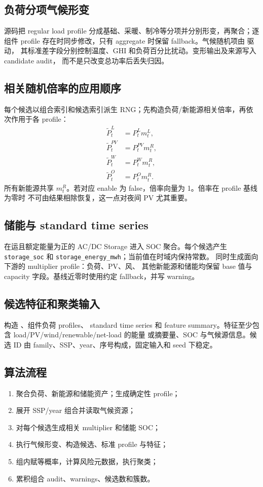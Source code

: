 \subsection{负荷分项气候形变}
源码把 regular load profile 分成基础、采暖、制冷等分项并分别形变，再聚合；逐组件 profile
存在时同步修改，只有 aggregate 时保留 fallback。气候随机项由  驱动，
其标准差字段分别控制温度、GHI 和负荷百分比扰动。变形输出及来源写入 candidate audit，
而不是只改变总功率后丢失归因。

\subsection{相关随机倍率的应用顺序}
每个候选以组合索引和候选索引派生 RNG；先构造负荷/新能源相关倍率，再依次作用于各 profile：
\begin{align}
 \widetilde P^L_t&=P^L_t m^L_t,\\
 \widetilde P^{PV}_t&=P^{PV}_t m^R_t,\\
 \widetilde P^W_t&=P^W_t m^R_t,\\
 \widetilde P^O_t&=P^O_t m^R_t.
\end{align}
所有新能源共享 $m^R_t$。若对应 enable 为 false，倍率向量为 1。倍率在 profile 基线为零时
不可由结果相除恢复，这一点对夜间 PV 尤其重要。

\subsection{储能与 standard time series}
在运且额定能量为正的 AC/DC Storage 进入 SOC 聚合。每个候选产生
\texttt{storage\_soc} 和 \texttt{storage\_energy\_mwh}；当前值在时域内保持常数。
 同时生成面向下游的 multiplier profile：负荷、PV、风、
其他新能源和储能均保留 base 值与 capacity 字段。基线近零时使用约定 fallback，并写 warning。

\subsection{候选特征和聚类输入}
 构造 、组件负荷 profiles、
standard time series 和 feature summary。特征至少包含 load/PV/wind/renewable/net-load 的能量
或摘要量、SOC 与气候源信息。候选 ID 由 family、SSP、year、序号构成，固定输入和 seed 下稳定。

\subsection{算法流程}
\begin{enumerate}
  \item 聚合负荷、新能源和储能资产；生成确定性 profile；
  \item 展开 SSP/year 组合并读取气候资源；
  \item 对每个候选生成相关 multiplier 和储能 SOC；
  \item 执行气候形变、构造候选、标准 profile 与特征；
  \item 组内赋等概率，计算风险元数据，执行聚类；
  \item 累积组合 audit、warnings、候选数和簇数。
\end{enumerate}

